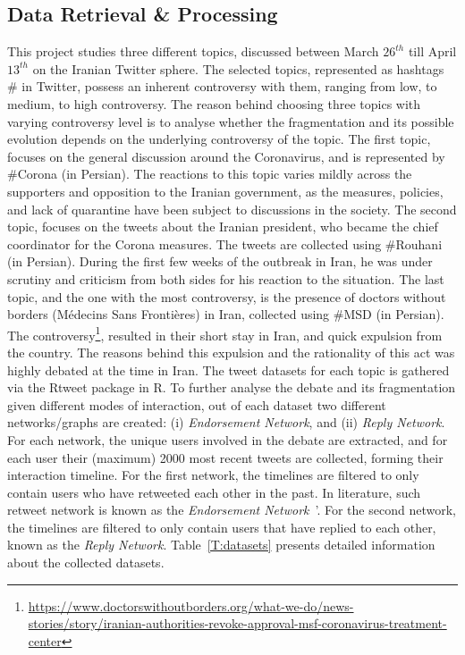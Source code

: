 \documentclass[journal,11pt]{IEEEtran}
\begin{document}
\subsection{Data Retrieval \& Processing}
\label{S:DR}
This project studies three different topics, discussed between March $26^{th}$ till April $13^{th}$ on the Iranian Twitter sphere.
The selected topics, represented as hashtags $\#$ in Twitter, possess an inherent controversy with them, ranging from low, to medium, to high controversy.
The reason behind choosing three topics with varying controversy level is to analyse whether the fragmentation and its possible evolution depends on the underlying controversy of the topic.
The first topic, focuses on the general discussion around the Coronavirus, and is represented by \#Corona (in Persian). The reactions to this topic varies mildly across the supporters and opposition to the Iranian government, as the measures, policies, and lack of quarantine have been subject to discussions in the society. The second topic, focuses on the tweets about the Iranian president, who became the chief coordinator for the Corona measures. The tweets are collected using \#Rouhani (in Persian). During the first few weeks of the outbreak in Iran, he was under scrutiny and criticism from both sides for his reaction to the situation. The last topic, and the one with the most controversy, is the presence of doctors without borders (Médecins Sans Frontières) in Iran, collected using \#MSD (in Persian). The controversy\footnote{\href{https://www.doctorswithoutborders.org/what-we-do/news-stories/story/iranian-authorities-revoke-approval-msf-coronavirus-treatment-center}{https://www.doctorswithoutborders.org/what-we-do/news-stories/story/iranian-authorities-revoke-approval-msf-coronavirus-treatment-center}}, resulted in their short stay in Iran, and quick expulsion from the country. The reasons behind this expulsion and the rationality of this act was highly debated at the time in Iran. The tweet datasets for each topic is gathered via the Rtweet package in R. To further analyse the debate and its fragmentation given different modes of interaction, out of each dataset two different networks/graphs are created: (i) \emph{Endorsement Network}, and (ii) \emph{Reply Network}. For each network, the unique users involved in the debate are extracted, and for each user their (maximum) 2000 most recent tweets are collected, forming their interaction timeline. For the first network, the timelines are filtered to only contain users who have retweeted each other in the past. In literature, such retweet network is known as the \emph{Endorsement Network}~\cite{morgan2013news,colleoni2014echo}'. For the second network, the timelines are filtered to only contain users that have replied to each other, known as the \emph{Reply Network}. Table~\ref{T:datasets} presents detailed information about the collected datasets.
\end{document}
